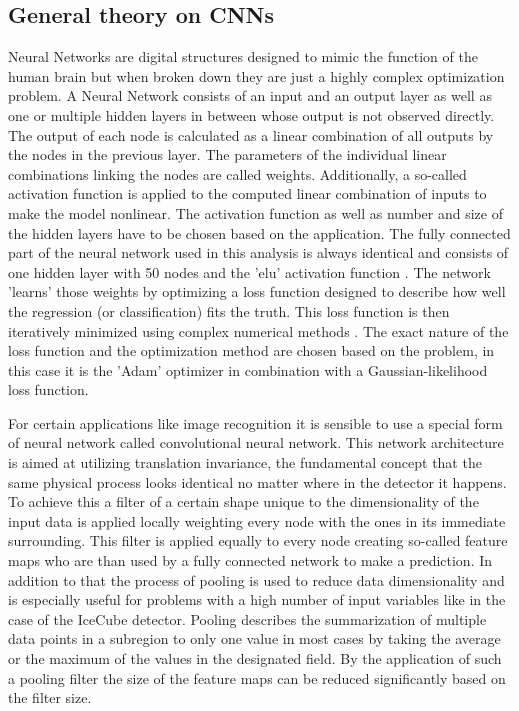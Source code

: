 \documentclass[
  tucolor,       %
  BCOR=12mm,     %
  parskip=half,  %
  open=any,      %
  cleardoublepage=plain,  %
]{tudothesis}
\begin{document}
\subsection{General theory on CNNs}
Neural Networks are digital structures designed to mimic the function of the human brain but when broken down they are just a highly complex optimization problem.
A Neural Network consists of an input and an output layer as well as one or multiple hidden layers in between whose output is not observed directly.%
The output of each node is calculated as a linear combination of all outputs by the nodes in the previous layer. The parameters of the individual linear combinations linking the nodes are called weights. Additionally, a so-called activation function is applied to the computed linear combination of inputs to make the model nonlinear.
The activation function as well as number and size of the hidden layers have to be chosen based on the application. The fully connected part of the neural network used in this analysis is always identical and consists of one hidden layer with 50 nodes and the 'elu' activation function \cite{clevert2016fast}.
The network 'learns' those weights by optimizing a loss function designed to describe how well the regression (or classification) fits the truth.
This loss function is then iteratively minimized using complex numerical methods \cite{hastie2009elements}. The exact nature of the loss function and the optimization method are chosen based on the problem, in this case it is the 'Adam' optimizer \cite{kingma2017adam} in combination with a Gaussian-likelihood loss function.

For certain applications like image recognition it is sensible to use a special form of neural network called convolutional neural network.
This network architecture is aimed at utilizing translation invariance, the fundamental concept that the same physical process looks identical no matter where in the detector it happens.
To achieve this a filter of a certain shape unique to the dimensionality of the input data is applied locally weighting every node with the ones in its immediate surrounding.
This filter is applied equally to every node creating so-called feature maps who are than used by a fully connected network to make a prediction. In addition to that the process of pooling is used to reduce data dimensionality and is especially useful for problems with a high number of input variables like in the case of the IceCube detector.
Pooling describes the summarization of multiple data points in a subregion to only one value in most cases by taking the average or the maximum of the values in the designated field. By the application of such a pooling filter the size of the feature maps can be reduced significantly based on the filter size. \cite{dumoulin2018guide} 
\end{document}
